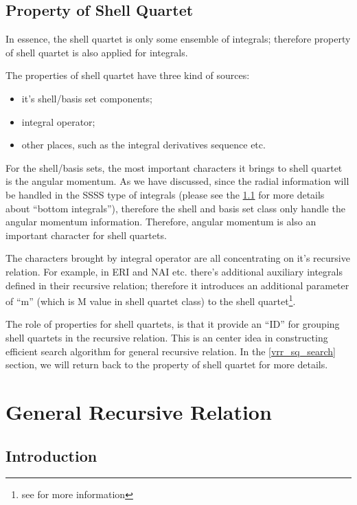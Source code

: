 \subsection{Property of Shell Quartet}
%
%
\label{property_sq}
In essence, the shell quartet is only some ensemble of integrals; therefore
property of shell quartet is also applied for integrals. 

The properties of shell quartet have three kind of sources: 
\begin{itemize}
 \item it's shell/basis set components;
 \item integral operator;
 \item other places, such as the integral derivatives sequence etc.
\end{itemize}

For the shell/basis sets, the most important characters it brings to shell
quartet is the angular momentum. As we have discussed, since the radial 
information will be handled in the SSSS type of integrals (please see the 
\ref{rr_introduction} for more details about ``bottom integrals''), therefore
the shell and basis set class only handle the angular momentum information.
Therefore, angular momentum is also an important character for shell quartets.

The characters brought by integral operator are all concentrating on it's 
recursive relation. For example, in ERI and NAI etc. there's additional 
auxiliary integrals defined in their recursive relation; therefore it 
introduces an additional parameter of ``m'' (which is M value in shell quartet
class) to the shell quartet\footnote{see \cite{OS1986} for more information}.

The role of properties for shell quartets, is that it provide an ``ID'' for 
grouping shell quartets in the recursive relation. This is an center idea
in constructing efficient search algorithm for general recursive relation.
In the \ref{vrr_sq_search} section, we will return back to the property of 
shell quartet for more details. 

\section{General Recursive Relation}
%
%
%
\subsection{Introduction}
%
%
%
\label{rr_introduction}

